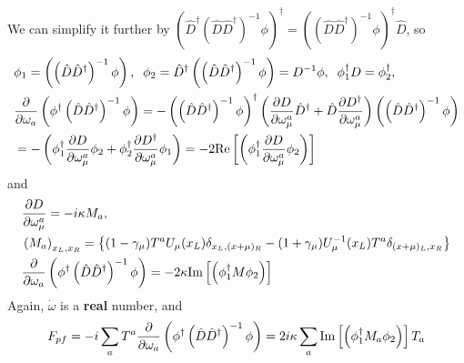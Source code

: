 We can simplify it further by $\left(\hat{D}^{\dagger}(\hat{D}\hat{D}^{\dagger})^{-1}\phi\right)^{\dagger}=\left((\hat{D}\hat{D}^{\dagger})^{-1}\phi\right)^{\dagger}\hat{D}$, so
\begin{equation}
\begin{split}
&\phi _1=\left(\left(\hat{D}\hat{D}^{\dagger}\right)^{-1}\phi\right),\;\;
 \phi _2=\hat{D}^{\dagger}\left(\left(\hat{D}\hat{D}^{\dagger}\right)^{-1}\phi\right)=D^{-1}\phi,\;\;\phi _1^{\dagger}D=\phi _2^{\dagger},\\
&\frac{\partial}{\partial \omega_a} \left(\phi ^{\dagger}\left(\hat{D}\hat{D}^{\dagger}\right)^{-1}\phi\right)=-\left(\left(\hat{D}\hat{D}^{\dagger}\right)^{-1}\phi\right)^{\dagger}\left(\frac{\partial D}{\partial \omega _{\mu}^a}\hat{D}^{\dagger}+\hat{D}\frac{\partial D^{\dagger}}{\partial \omega _{\mu}^a}\right)\left(\left(\hat{D}\hat{D}^{\dagger}\right)^{-1}\phi\right)\\
&=-\left(\phi _1^{\dagger} \frac{\partial D}{\partial \omega _{\mu}^a} \phi _2+\phi _2^{\dagger} \frac{\partial D^{\dagger}}{\partial \omega _{\mu}^a} \phi _1\right)=-2{\rm Re}\left[\left(\phi _1 ^{\dagger} \frac{\partial D}{\partial \omega _{\mu}^a} \phi _2\right)\right]\\
\end{split}
\end{equation}
and
\begin{equation}
\begin{split}
&\frac{\partial D}{\partial \omega _{\mu}^a}=-i\kappa M_a,\\
&\left(M_a\right)_{x_L,x_R}=\left\{(1-\gamma _{\mu})T^aU_{\mu}(x_L)\delta _{x_L,(x+\mu)_R}-(1+\gamma _{\mu})U_{\mu}^{-1}(x_L)T^a\delta _{(x+\mu)_L,x_R}\right\}\\
&\frac{\partial}{\partial \omega_a} \left(\phi ^{\dagger}\left(\hat{D}\hat{D}^{\dagger}\right)^{-1}\phi\right)=-2\kappa{\rm Im}\left[\left(\phi _1 ^{\dagger} M \phi _2\right)\right]\\
\end{split}
\end{equation}
Again, $\dot{\omega}$ is a \textbf{real} number, and
\begin{equation}
\begin{split}
&F_{pf}=-i\sum _a T^a \frac{\partial}{\partial \omega_a} \left(\phi ^{\dagger}\left(\hat{D}\hat{D}^{\dagger}\right)^{-1}\phi\right)=2i\kappa \sum _a {\rm Im}\left[\left(\phi _1 ^{\dagger} M_a \phi _2\right)\right] T_a\\
\end{split}
\end{equation}

